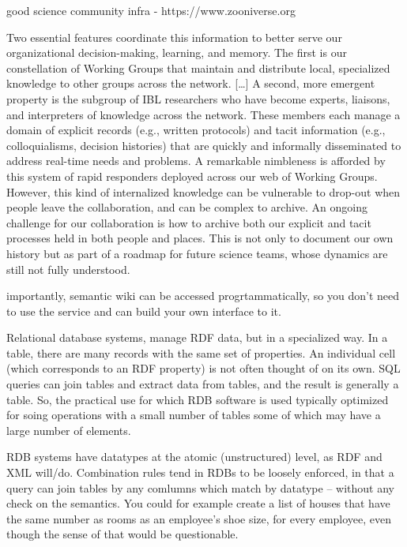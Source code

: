 \documentclass[10pt]{article}
\begin{document}
\begin{multicols}{2}
good science community infra - https://www.zooniverse.org

\begin{leftbar}
Two essential features coordinate this information to better serve our
organizational decision-making, learning, and memory. The first is our
constellation of Working Groups that maintain and distribute local,
specialized knowledge to other groups across the network. {[}\ldots{]} A
second, more emergent property is the subgroup of IBL researchers who
have become experts, liaisons, and interpreters of knowledge across the
network. These members each manage a domain of explicit records (e.g.,
written protocols) and tacit information (e.g., colloquialisms, decision
histories) that are quickly and informally disseminated to address
real-time needs and problems. A remarkable nimbleness is afforded by
this system of rapid responders deployed across our web of Working
Groups. However, this kind of internalized knowledge can be vulnerable
to drop-out when people leave the collaboration, and can be complex to
archive. An ongoing challenge for our collaboration is how to archive
both our explicit and tacit processes held in both people and places.
This is not only to document our own history but as part of a roadmap
for future science teams, whose dynamics are still not fully understood.
\cite{woolKnowledgeNetworksHow2020} 
\end{leftbar}

importantly, semantic wiki can be accessed progrtammatically, so you
don't need to use the service and can build your own interface to it.

\begin{leftbar}
Relational database systems, manage RDF data, but in a specialized way.
In a table, there are many records with the same set of properties. An
individual cell (which corresponds to an RDF property) is not often
thought of on its own. SQL queries can join tables and extract data from
tables, and the result is generally a table. So, the practical use for
which RDB software is used typically optimized for soing operations with
a small number of tables some of which may have a large number of
elements.

RDB systems have datatypes at the atomic (unstructured) level, as RDF
and XML will/do. Combination rules tend in RDBs to be loosely enforced,
in that a query can join tables by any comlumns which match by datatype
-- without any check on the semantics. You could for example create a
list of houses that have the same number as rooms as an employee's shoe
size, for every employee, even though the sense of that would be
questionable.


\end{leftbar}
\end{multicols}
\end{document}
